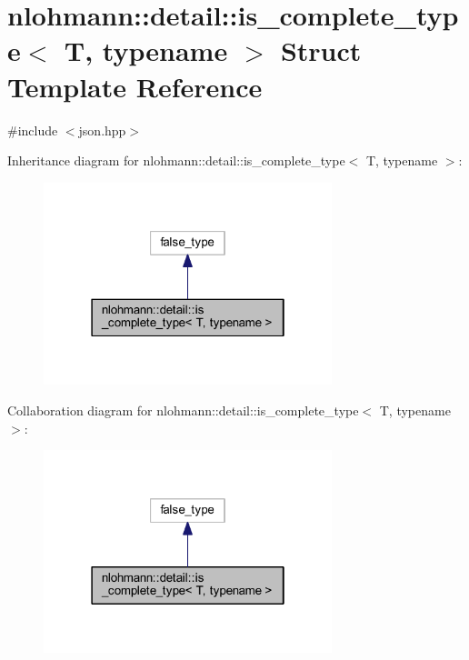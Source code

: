 \hypertarget{structnlohmann_1_1detail_1_1is__complete__type}{}\section{nlohmann\+::detail\+::is\+\_\+complete\+\_\+type$<$ T, typename $>$ Struct Template Reference}
\label{structnlohmann_1_1detail_1_1is__complete__type}


{\ttfamily \#include $<$json.\+hpp$>$}



Inheritance diagram for nlohmann\+::detail\+::is\+\_\+complete\+\_\+type$<$ T, typename $>$\+:
\nopagebreak
\begin{figure}[H]
\begin{center}
\leavevmode
\includegraphics[width=238pt]{structnlohmann_1_1detail_1_1is__complete__type__inherit__graph}
\end{center}
\end{figure}


Collaboration diagram for nlohmann\+::detail\+::is\+\_\+complete\+\_\+type$<$ T, typename $>$\+:
\nopagebreak
\begin{figure}[H]
\begin{center}
\leavevmode
\includegraphics[width=238pt]{structnlohmann_1_1detail_1_1is__complete__type__coll__graph}
\end{center}
\end{figure}


